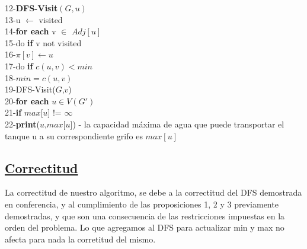 \documentclass{article}
\begin{document}
\begin{algorithm}[H]
        12-\hspace*{1em}\textbf{DFS-Visit$(G,u)$}\\ 
        13-\hspace*{2em}u $\leftarrow$ visited \\  
        14-\hspace*{2em}\textbf{for each} v $\in$ $Adj[u]$\\
        15-\hspace*{3em}do \textbf{if} v not visited\\
        16-\hspace*{4em}$\pi[v] \leftarrow u$\\
        17-\hspace*{4em}do \textbf{if} $c(u,v)< min$\\
        18-\hspace*{5em}$min=c(u,v)$\\
        19-\hspace*{4em}DFS-Visit($G$,$v$)\\
        
        20-\hspace*{1em}\textbf{for each} $u \in V(G')$\\
        21-\hspace*{2em}\textbf{if} $max$[$u$] != $\infty$\\
        22-\hspace*{3em}\textbf{print}($u$,$max$[$u$]) - la capacidad m\'axima de agua que puede transportar el tanque u a su correspondiente grifo es $max[u]$\\
        
    \end{algorithm}

    \subsection{\underline{Correctitud}}

    La correctitud de nuestro algoritmo, se debe a la correctitud del DFS demostrada en conferencia, y al cumplimiento de las proposiciones 
    1, 2 y 3 previamente demostradas, y que son una consecuencia de las restricciones impuestas en la orden del problema. Lo que
    agregamos al DFS para actualizar min y max no afecta para nada la corretitud del mismo.\\
\end{document}

